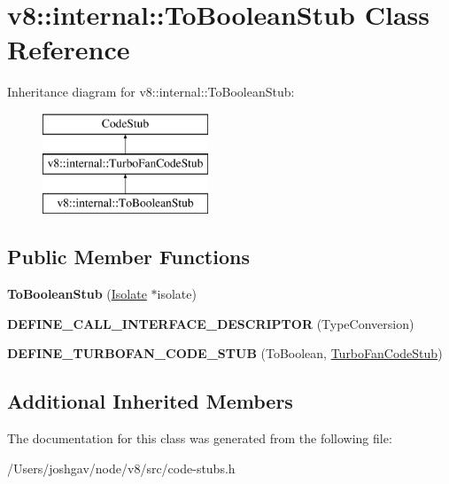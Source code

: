 \hypertarget{classv8_1_1internal_1_1_to_boolean_stub}{}\section{v8\+:\+:internal\+:\+:To\+Boolean\+Stub Class Reference}
\label{classv8_1_1internal_1_1_to_boolean_stub}
Inheritance diagram for v8\+:\+:internal\+:\+:To\+Boolean\+Stub\+:\begin{figure}[H]
\begin{center}
\leavevmode
\includegraphics[height=3.000000cm]{classv8_1_1internal_1_1_to_boolean_stub}
\end{center}
\end{figure}
\subsection*{Public Member Functions}
\begin{DoxyCompactItemize}
\item 
{\bfseries To\+Boolean\+Stub} (\hyperlink{classv8_1_1internal_1_1_isolate}{Isolate} $\ast$isolate)\hypertarget{classv8_1_1internal_1_1_to_boolean_stub_a622dada325a794cf9148f9f61d11a740}{}\label{classv8_1_1internal_1_1_to_boolean_stub_a622dada325a794cf9148f9f61d11a740}

\item 
{\bfseries D\+E\+F\+I\+N\+E\+\_\+\+C\+A\+L\+L\+\_\+\+I\+N\+T\+E\+R\+F\+A\+C\+E\+\_\+\+D\+E\+S\+C\+R\+I\+P\+T\+OR} (Type\+Conversion)\hypertarget{classv8_1_1internal_1_1_to_boolean_stub_a940a8298a55eb0009549b28e24686eab}{}\label{classv8_1_1internal_1_1_to_boolean_stub_a940a8298a55eb0009549b28e24686eab}

\item 
{\bfseries D\+E\+F\+I\+N\+E\+\_\+\+T\+U\+R\+B\+O\+F\+A\+N\+\_\+\+C\+O\+D\+E\+\_\+\+S\+T\+UB} (To\+Boolean, \hyperlink{classv8_1_1internal_1_1_turbo_fan_code_stub}{Turbo\+Fan\+Code\+Stub})\hypertarget{classv8_1_1internal_1_1_to_boolean_stub_a74186d5755f118127ade391af3d0fb5e}{}\label{classv8_1_1internal_1_1_to_boolean_stub_a74186d5755f118127ade391af3d0fb5e}

\end{DoxyCompactItemize}
\subsection*{Additional Inherited Members}


The documentation for this class was generated from the following file\+:\begin{DoxyCompactItemize}
\item 
/\+Users/joshgav/node/v8/src/code-\/stubs.\+h\end{DoxyCompactItemize}

